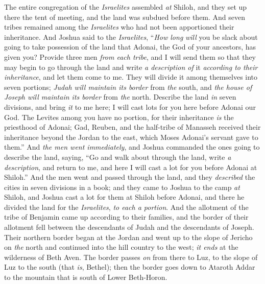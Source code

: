 \begin{biblechapter} %
 The entire congregation of the \textit{Israelites} assembled \textit{at} Shiloh, and they set up there the tent of meeting, and the land was subdued before them.
\verse And seven tribes remained among the \textit{Israelites} who had not been apportioned their inheritance.
\verse And Joshua said to the \textit{Israelites}, “\textit{How long} \textit{will} you be slack about going to take possession of the land that Adonai, the God of your ancestors, has given you?
\verse Provide three men \textit{from each tribe}, and I will send them so that they may begin to go through the land and write \textit{a description of} it \textit{according to their inheritance}, and let them come to me.
\verse They will divide it among themselves into seven portions; \textit{Judah will maintain its border} from \textit{the} south, and \textit{the house of Joseph will maintain its border} from \textit{the} north.
\verse Describe the land \textit{in} seven divisions, and bring \textit{it} to me here; I will cast lots for you here before Adonai our God.
\verse The Levites among you have no portion, for their inheritance \textit{is} the priesthood of Adonai; Gad, Reuben, and the half-tribe of Manasseh received their inheritance beyond the Jordan to the east, which Moses Adonai’s servant gave to them.”
\verse And \textit{the men went immediately}, and Joshua commanded the ones going to describe the land, saying, “Go and walk about through the land, write \textit{a description}, and return to me, and here I will cast a lot for you before Adonai at Shiloh.”
\verse And the men went and passed through the land, and they \textit{described} the cities in seven divisions in a book; and they came to Joshua to the camp \textit{at} Shiloh,
\verse and Joshua cast a lot for them at Shiloh before Adonai, and there he divided the land for the \textit{Israelites}, \textit{to each a portion}.
 And the allotment of the tribe of Benjamin came up according to their families, and the border of their allotment fell between the descendants of Judah and the descendants of Joseph.
\verse Their northern border began at the Jordan and went up to the slope of Jericho on \textit{the} north and continued into the hill country to the west; \textit{it ends} at the wilderness of Beth Aven.
\verse The border passes \textit{on} from there to Luz, to the slope of Luz to the south (that \textit{is}, Bethel); then the border goes down to Ataroth Addar to the mountain that is south of Lower Beth-Horon.

\end{biblechapter}
